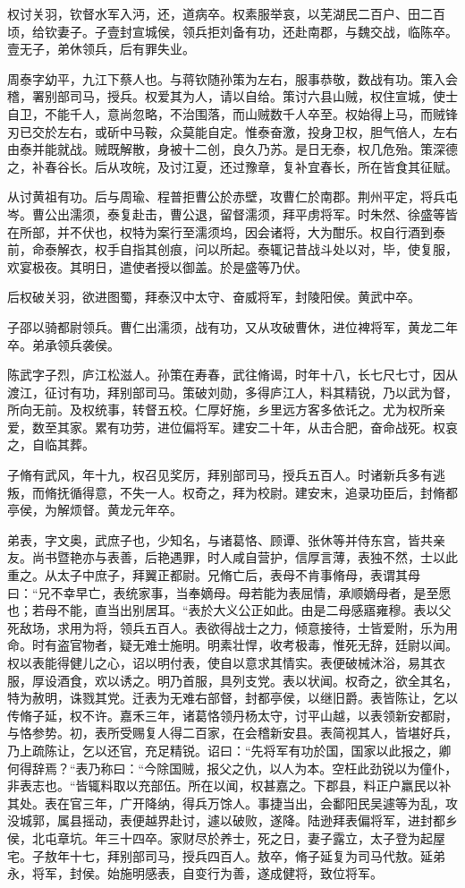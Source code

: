 \documentclass[12pt,UTF8]{ctexbook}
\begin{document}
权讨关羽，钦督水军入沔，还，道病卒。权素服举哀，以芜湖民二百户、田二百顷，给钦妻子。子壹封宣城侯，领兵拒刘备有功，还赴南郡，与魏交战，临陈卒。壹无子，弟休领兵，后有罪失业。

周泰字幼平，九江下蔡人也。与蒋钦随孙策为左右，服事恭敬，数战有功。策入会稽，署别部司马，授兵。权爱其为人，请以自给。策讨六县山贼，权住宣城，使士自卫，不能千人，意尚忽略，不治围落，而山贼数千人卒至。权始得上马，而贼锋刃已交於左右，或斫中马鞍，众莫能自定。惟泰奋激，投身卫权，胆气倍人，左右由泰并能就战。贼既解散，身被十二创，良久乃苏。是日无泰，权几危殆。策深德之，补春谷长。后从攻皖，及讨江夏，还过豫章，复补宜春长，所在皆食其征赋。

从讨黄祖有功。后与周瑜、程普拒曹公於赤壁，攻曹仁於南郡。荆州平定，将兵屯岑。曹公出濡须，泰复赴击，曹公退，留督濡须，拜平虏将军。时朱然、徐盛等皆在所部，并不伏也，权特为案行至濡须坞，因会诸将，大为酣乐。权自行酒到泰前，命泰解衣，权手自指其创痕，问以所起。泰辄记昔战斗处以对，毕，使复服，欢宴极夜。其明日，遣使者授以御盖。於是盛等乃伏。

后权破关羽，欲进图蜀，拜泰汉中太守、奋威将军，封陵阳侯。黄武中卒。

子邵以骑都尉领兵。曹仁出濡须，战有功，又从攻破曹休，进位裨将军，黄龙二年卒。弟承领兵袭侯。

陈武字子烈，庐江松滋人。孙策在寿春，武往脩谒，时年十八，长七尺七寸，因从渡江，征讨有功，拜别部司马。策破刘勋，多得庐江人，料其精锐，乃以武为督，所向无前。及权统事，转督五校。仁厚好施，乡里远方客多依讬之。尤为权所亲爱，数至其家。累有功劳，进位偏将军。建安二十年，从击合肥，奋命战死。权哀之，自临其葬。

子脩有武风，年十九，权召见奖厉，拜别部司马，授兵五百人。时诸新兵多有逃叛，而脩抚循得意，不失一人。权奇之，拜为校尉。建安末，追录功臣后，封脩都亭侯，为解烦督。黄龙元年卒。

弟表，字文奥，武庶子也，少知名，与诸葛恪、顾谭、张休等并侍东宫，皆共亲友。尚书暨艳亦与表善，后艳遇罪，时人咸自营护，信厚言薄，表独不然，士以此重之。从太子中庶子，拜翼正都尉。兄脩亡后，表母不肯事脩母，表谓其母曰：“兄不幸早亡，表统家事，当奉嫡母。母若能为表屈情，承顺嫡母者，是至愿也；若母不能，直当出别居耳。“表於大义公正如此。由是二母感寤雍穆。表以父死敌场，求用为将，领兵五百人。表欲得战士之力，倾意接待，士皆爱附，乐为用命。时有盗官物者，疑无难士施明。明素壮悍，收考极毒，惟死无辞，廷尉以闻。权以表能得健儿之心，诏以明付表，使自以意求其情实。表便破械沐浴，易其衣服，厚设酒食，欢以诱之。明乃首服，具列支党。表以状闻。权奇之，欲全其名，特为赦明，诛戮其党。迁表为无难右部督，封都亭侯，以继旧爵。表皆陈让，乞以传脩子延，权不许。嘉禾三年，诸葛恪领丹杨太守，讨平山越，以表领新安都尉，与恪参势。初，表所受赐复人得二百家，在会稽新安县。表简视其人，皆堪好兵，乃上疏陈让，乞以还官，充足精锐。诏曰：“先将军有功於国，国家以此报之，卿何得辞焉？“表乃称曰：“今除国贼，报父之仇，以人为本。空枉此劲锐以为僮仆，非表志也。“皆辄料取以充部伍。所在以闻，权甚嘉之。下郡县，料正户羸民以补其处。表在官三年，广开降纳，得兵万馀人。事捷当出，会鄱阳民吴遽等为乱，攻没城郭，属县摇动，表便越界赴讨，遽以破败，遂降。陆逊拜表偏将军，进封都乡侯，北屯章坑。年三十四卒。家财尽於养士，死之日，妻子露立，太子登为起屋宅。子敖年十七，拜别部司马，授兵四百人。敖卒，脩子延复为司马代敖。延弟永，将军，封侯。始施明感表，自变行为善，遂成健将，致位将军。
\end{document}
